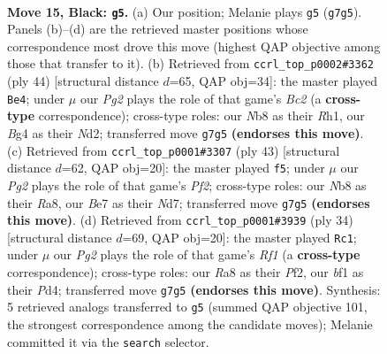 \documentclass[11pt]{article}
\begin{document}
\clearpage

\begin{figure}[p]\centering
\begin{subfigure}{0.46\textwidth}\centering
\resizebox{\linewidth}{!}{%
\newchessgame
\chessboard[
  setfen={rn3r2/1pp1bppk/p6p/4P2P/P1p2Pb1/2N1P3/1P1N4/R3KB1R b KQ - 0 15},
  showmover=false,
  pgfstyle=straightmove, color=movearrow, markmove={g7-g5}
]}
\caption{}
\end{subfigure}\hfill
\begin{subfigure}{0.46\textwidth}\centering
\resizebox{\linewidth}{!}{%
\newchessgame
\chessboard[
  setfen={r2r2k1/p5np/5p2/1p1npP2/2p4N/2P3Pb/PPBNKR1P/7R w - - 2 23},
  showmover=false,
  pgfstyle=straightmove, color=movearrow, markmove={c2-e4}
]}
\caption{}
\end{subfigure}
\\[4pt]
\begin{subfigure}{0.46\textwidth}\centering
\resizebox{\linewidth}{!}{%
\newchessgame
\chessboard[
  setfen={r3r1k1/1p1n1pp1/2p1b2p/8/p2Pp3/P3P2P/1PRNBPP1/4R1K1 b - - 0 22},
  showmover=false,
  pgfstyle=straightmove, color=movearrow, markmove={f7-f5}
]}
\caption{}
\end{subfigure}\hfill
\begin{subfigure}{0.46\textwidth}\centering
\resizebox{\linewidth}{!}{%
\newchessgame
\chessboard[
  setfen={r1b2rk1/1p3p2/2p2np1/p2p4/P2P3p/RN1BP3/1P3PPP/5RK1 w - - 0 18},
  showmover=false,
  pgfstyle=straightmove, color=movearrow, markmove={f1-c1}
]}
\caption{}
\end{subfigure}
\caption{\textbf{Move 15, Black: \texttt{g5}.} (a) Our position; Melanie plays \texttt{g5} (\texttt{g7g5}). Panels (b)--(d) are the retrieved master positions whose correspondence most drove this move (highest QAP objective among those that transfer to it). (b) Retrieved from \texttt{ccrl\_top\_p0002\#3362} (ply 44) [structural distance $d$=65, QAP obj=34]: the master played \texttt{Be4}; under $\mu$ our \emph{Pg2} plays the role of that game's \emph{Bc2} (a \textbf{cross-type} correspondence); cross-type roles: our \emph{N}b8 as their \emph{R}h1, our \emph{B}g4 as their \emph{N}d2; transferred move \texttt{g7g5} \textbf{(endorses this move)}. (c) Retrieved from \texttt{ccrl\_top\_p0001\#3307} (ply 43) [structural distance $d$=62, QAP obj=20]: the master played \texttt{f5}; under $\mu$ our \emph{Pg2} plays the role of that game's \emph{Pf2}; cross-type roles: our \emph{N}b8 as their \emph{R}a8, our \emph{B}e7 as their \emph{N}d7; transferred move \texttt{g7g5} \textbf{(endorses this move)}. (d) Retrieved from \texttt{ccrl\_top\_p0001\#3939} (ply 34) [structural distance $d$=69, QAP obj=20]: the master played \texttt{Rc1}; under $\mu$ our \emph{Pg2} plays the role of that game's \emph{Rf1} (a \textbf{cross-type} correspondence); cross-type roles: our \emph{R}a8 as their \emph{P}f2, our \emph{b}f1 as their \emph{P}d4; transferred move \texttt{g7g5} \textbf{(endorses this move)}. Synthesis: 5 retrieved analogs transferred to \texttt{g5} (summed QAP objective 101, the strongest correspondence among the candidate moves); Melanie committed it via the \texttt{search} selector.}
\label{fig:thought-m29}
\end{figure}
\end{document}
